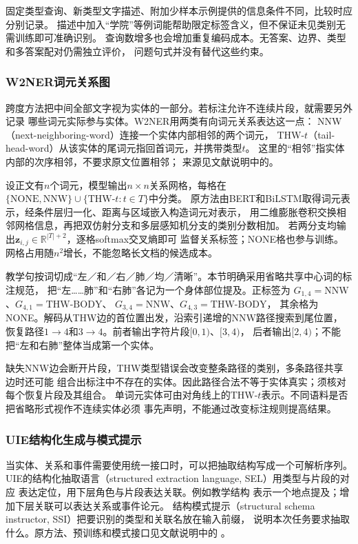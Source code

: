 固定类型查询、新类型文字描述、附加少样本示例提供的信息条件不同，比较时应分别记录。
描述中加入“学院”等例词能帮助限定标签含义，但不保证未见类别无需训练即可准确识别。
查询数增多也会增加重复编码成本。无答案、边界、类型和多答案配对仍需独立评价，
问题句式并没有替代这些约束。

\subsubsection{W2NER词元关系图}
\label{sec:nlp-extraction-w2ner}

跨度方法把中间全部文字视为实体的一部分。若标注允许不连续片段，就需要另外记录
哪些词元实际参与实体。W2NER用两类有向词元关系表达这一点：
NNW（next-neighboring-word）连接一个实体内部相邻的两个词元，
THW-$t$（tail-head-word）从该实体的尾词元指回首词元，并携带类型$t$。
这里的“相邻”指实体内部的次序相邻，不要求原文位置相邻；
来源见文献说明中的。

设正文有$n$个词元，模型输出$n\times n$关系网格，每格在
$\{\mathrm{NONE},\mathrm{NNW}\}\cup\{\mathrm{THW}\text{-}t:t\in T\}$中分类。
原方法由BERT和BiLSTM取得词元表示，经条件层归一化、距离与区域嵌入构造词元对表示，
用二维膨胀卷积交换相邻网格信息，再把双仿射分支和多层感知机分支的类别分数相加。
若两分支均输出$\bm{z}_{i,j}\in\mathbb{R}^{|T|+2}$，逐格softmax交叉熵即可
监督关系标签；NONE格也参与训练。网格占用随$n^2$增长，不能忽略长文档的候选成本。

教学句按词切成“左／和／右／肺／均／清晰”。本节明确采用省略共享中心词的标注规范，
把“左……肺”和“右肺”各记为一个身体部位提及。正标签为
$G_{1,4}=\mathrm{NNW}$、$G_{4,1}=\mathrm{THW}\text{-}\mathrm{BODY}$、
$G_{3,4}=\mathrm{NNW}$、$G_{4,3}=\mathrm{THW}\text{-}\mathrm{BODY}$，
其余格为NONE。解码从THW边的首位置出发，沿索引递增的NNW路径搜索到尾位置，
恢复路径$1\to4$和$3\to4$。前者输出字符片段$[0,1)$、$[3,4)$，
后者输出$[2,4)$；不能把“左和右肺”整体当成第一个实体。

缺失NNW边会断开片段，THW类型错误会改变整条路径的类别，多条路径共享边时还可能
组合出标注中不存在的实体。因此路径合法不等于实体真实；须核对每个恢复片段及其组合。
单词元实体可由对角线上的THW-$t$表示。不同语料是否把省略形式视作不连续实体必须
事先声明，不能通过改变标注规则提高结果。

\subsubsection{UIE结构化生成与模式提示}
\label{sec:nlp-extraction-uie}

当实体、关系和事件需要使用统一接口时，可以把抽取结构写成一个可解析序列。
UIE的结构化抽取语言（structured extraction language, SEL）用类型与片段的对应
表达定位，用下层角色与片段表达关联。例如教学结构
表示一个地点提及；增加下层关联可以表达关系或事件论元。
结构模式提示（structural schema instructor, SSI）把要识别的类型和关联名放在输入前缀，
说明本次任务要求抽取什么。原方法、预训练和模式接口见文献说明中的
。

